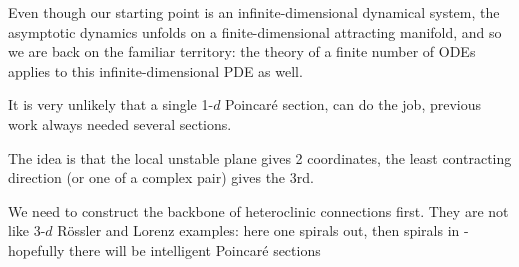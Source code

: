 \bigskip

Even though our starting point  is an infinite-dimensional
dynamical system, the asymptotic dynamics unfolds on a
finite-dimensional attracting manifold, and so we are back on the
familiar territory: the theory of a finite number of ODEs applies to
this infinite-dimensional PDE as well.

\bigskip

It is very unlikely that a single 1-$d$ Poincar\'e section,
can do the job, previous work
always needed several sections.

The idea is that the local unstable plane gives 2 coordinates, the
least contracting direction (or one of a complex pair) gives the 3rd.

We need to construct the backbone of heteroclinic connections
first. They are not like 3-$d$ R\"ossler and Lorenz examples:
here one spirals out,
then spirals in - hopefully there will be intelligent Poincar\'e sections
